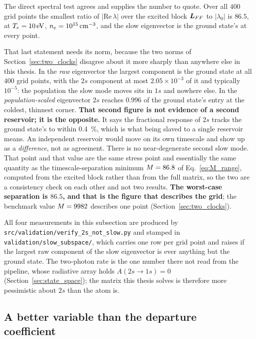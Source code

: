 The direct spectral test agrees and supplies the number to quote. Over all
$400$ grid points the smallest ratio of $|\mathrm{Re}\,\lambda|$ over the
excited block $\bm{L}_{FF}$ to $|\lambda_0|$ is $86.5$, at
$T_e = \SI{10}{\electronvolt}$, $n_e = \SI{e15}{\per\cubic\centi\metre}$,
and the slow eigenvector is the ground state's at every point.

That last statement needs its norm, because the two norms of
Section~\ref{sec:two_clocks} disagree about it more sharply than
anywhere else in this thesis. In the \emph{raw} eigenvector the largest
component is the ground state at all $400$ grid points, with the $2s$ component
at most $2.05\times10^{-3}$ of it and typically $10^{-5}$: the population the
slow mode moves sits in $1s$ and nowhere else. In the
\emph{population-scaled} eigenvector $2s$ reaches $0.996$ of the ground state's
entry at the coldest, thinnest corner. \textbf{That second figure is not
evidence of a second reservoir; it is the opposite.} It says the fractional
response of $2s$ tracks the ground state's to within
\SI{0.4}{\percent}, which is what being slaved to a single reservoir means. An
independent reservoir would move on its own timescale and show up as a
\emph{difference}, not as agreement. There is no near-degenerate second slow
mode. That point and that value are the
same stress point and essentially the same quantity as the timescale-separation
minimum $M = 86.8$ of Eq.~\eqref{eq:M_range}, computed from the excited
block rather than from the full matrix, so the two are a consistency check on
each other and not two results. \textbf{The worst-case separation is $86.5$,
and that is the figure that describes the grid}; the benchmark value
$M = 9982$ describes one point (Section~\ref{sec:two_clocks}).

All four measurements in this subsection are produced by
\texttt{src/validation/verify\_2s\_not\_slow.py} and stamped in
\texttt{validation/slow\_subspace/}, which carries one row per grid point and
raises if the largest raw component of the slow eigenvector is ever anything
but the ground state. The two-photon rate is the one number there not read from
the pipeline, whose radiative array holds $A(2s\to1s) = 0$
(Section~\ref{sec:state_space}); the matrix this thesis solves is therefore
more pessimistic about $2s$ than the atom is.

\subsection{A better variable than the departure coefficient}


